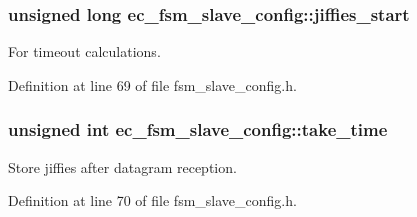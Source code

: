 \subsubsection[{jiffies\-\_\-start}]{\setlength{\rightskip}{0pt plus 5cm}unsigned long {\bf ec\-\_\-fsm\-\_\-slave\-\_\-config\-::jiffies\-\_\-start}}\label{structec__fsm__slave__config_aaca0412b1e9430abb207655e6a42830a}


\-For timeout calculations. 



\-Definition at line 69 of file fsm\-\_\-slave\-\_\-config.\-h.

\subsubsection[{take\-\_\-time}]{\setlength{\rightskip}{0pt plus 5cm}unsigned int {\bf ec\-\_\-fsm\-\_\-slave\-\_\-config\-::take\-\_\-time}}\label{structec__fsm__slave__config_a884fcfd4e7f6e89d0d99dab720939c07}


\-Store jiffies after datagram reception. 



\-Definition at line 70 of file fsm\-\_\-slave\-\_\-config.\-h.

